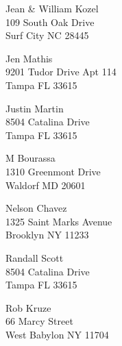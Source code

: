 \documentclass{article}
\begin{document}
\begin{center}
\begin{Huge}
\clearpage

\vspace*{\fill}
Jean \& William Kozel\\
109 South Oak Drive\\
Surf City NC 28445\\
\vspace{\fill}

\clearpage

\vspace*{\fill}
Jen Mathis\\
9201 Tudor Drive Apt 114\\
Tampa FL 33615\\
\vspace{\fill}

\clearpage

\vspace*{\fill}
Justin Martin\\
8504 Catalina Drive\\
Tampa FL 33615\\
\vspace{\fill}

\clearpage

\vspace*{\fill}
M Bourassa\\
1310 Greenmont Drive\\
Waldorf MD 20601\\
\vspace{\fill}

\clearpage

\vspace*{\fill}
Nelson Chavez\\
1325 Saint Marks Avenue\\
Brooklyn NY 11233\\
\vspace{\fill}

\clearpage

\vspace*{\fill}
Randall Scott\\
8504 Catalina Drive\\
Tampa FL 33615\\
\vspace{\fill}

\clearpage

\vspace*{\fill}
Rob Kruze\\
66 Marcy Street\\
West Babylon NY 11704\\
\vspace{\fill}


\end{Huge}
\end{center}
\end{document}
